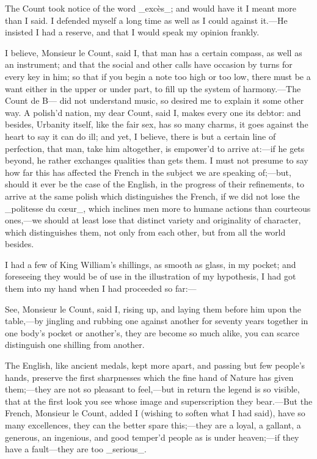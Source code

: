 \documentclass[twoside]{article}
\begin{document}
The Count took notice of the word _excès_; and would have it I meant more
than I said.  I defended myself a long time as well as I could against
it.—He insisted I had a reserve, and that I would speak my opinion
frankly.

I believe, Monsieur le Count, said I, that man has a certain compass, as
well as an instrument; and that the social and other calls have occasion
by turns for every key in him; so that if you begin a note too high or
too low, there must be a want either in the upper or under part, to fill
up the system of harmony.—The Count de B— did not understand music, so
desired me to explain it some other way.  A polish’d nation, my dear
Count, said I, makes every one its debtor: and besides, Urbanity itself,
like the fair sex, has so many charms, it goes against the heart to say
it can do ill; and yet, I believe, there is but a certain line of
perfection, that man, take him altogether, is empower’d to arrive at:—if
he gets beyond, he rather exchanges qualities than gets them.  I must not
presume to say how far this has affected the French in the subject we are
speaking of;—but, should it ever be the case of the English, in the
progress of their refinements, to arrive at the same polish which
distinguishes the French, if we did not lose the _politesse du cœur_,
which inclines men more to humane actions than courteous ones,—we should
at least lose that distinct variety and originality of character, which
distinguishes them, not only from each other, but from all the world
besides.

I had a few of King William’s shillings, as smooth as glass, in my
pocket; and foreseeing they would be of use in the illustration of my
hypothesis, I had got them into my hand when I had proceeded so far:—

See, Monsieur le Count, said I, rising up, and laying them before him
upon the table,—by jingling and rubbing one against another for seventy
years together in one body’s pocket or another’s, they are become so much
alike, you can scarce distinguish one shilling from another.

The English, like ancient medals, kept more apart, and passing but few
people’s hands, preserve the first sharpnesses which the fine hand of
Nature has given them;—they are not so pleasant to feel,—but in return
the legend is so visible, that at the first look you see whose image and
superscription they bear.—But the French, Monsieur le Count, added I
(wishing to soften what I had said), have so many excellences, they can
the better spare this;—they are a loyal, a gallant, a generous, an
ingenious, and good temper’d people as is under heaven;—if they have a
fault—they are too _serious_.
\end{document}

